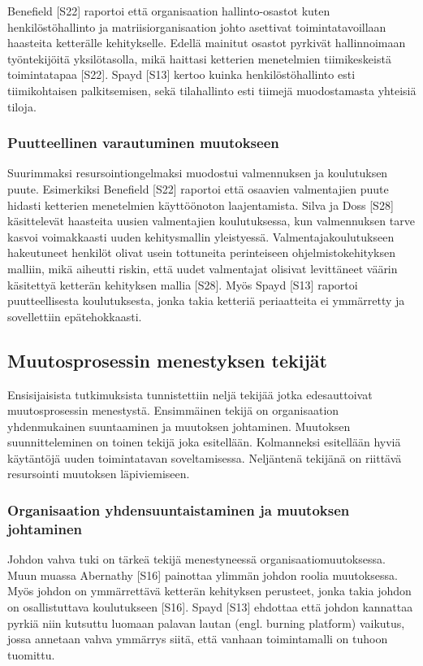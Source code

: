Benefield [S22] raportoi että organisaation hallinto-osastot kuten
henkilöstöhallinto ja matriisiorganisaation johto asettivat toimintatavoillaan
haasteita ketterälle kehitykselle. Edellä mainitut osastot pyrkivät
hallinnoimaan työntekijöitä yksilötasolla, mikä haittasi ketterien menetelmien
tiimikeskeistä toimintatapaa [S22]. Spayd [S13] kertoo kuinka henkilöstöhallinto
esti tiimikohtaisen palkitsemisen, sekä tilahallinto esti tiimejä muodostamasta
yhteisiä tiloja.

\subsubsection{Puutteellinen varautuminen muutokseen}

Suurimmaksi resursointiongelmaksi muodostui valmennuksen ja koulutuksen puute.
Esimerkiksi Benefield [S22] raportoi että osaavien valmentajien puute hidasti
ketterien menetelmien käyttöönoton laajentamista. Silva ja Doss [S28]
käsittelevät haasteita uusien valmentajien koulutuksessa, kun valmennuksen tarve
kasvoi voimakkaasti uuden kehitysmallin yleistyessä. Valmentajakoulutukseen
hakeutuneet henkilöt olivat usein tottuneita perinteiseen ohjelmistokehityksen
malliin, mikä aiheutti riskin, että uudet valmentajat olisivat levittäneet
väärin käsitettyä ketterän kehityksen mallia [S28]. Myös Spayd [S13] raportoi
puutteellisesta koulutuksesta, jonka takia ketteriä periaatteita ei ymmärretty
ja sovellettiin epätehokkaasti.

\subsection{Muutosprosessin menestyksen tekijät}

Ensisijaisista tutkimuksista tunnistettiin neljä tekijää jotka edesauttoivat
muutosprosessin menestystä. Ensimmäinen tekijä on organisaation yhdenmukainen
suuntaaminen ja muutoksen johtaminen. Muutoksen suunnitteleminen on toinen
tekijä joka esitellään. Kolmanneksi esitellään hyviä käytäntöjä uuden
toimintatavan soveltamisessa. Neljäntenä tekijänä on riittävä resursointi
muutoksen läpiviemiseen.

\subsubsection{Organisaation yhdensuuntaistaminen ja muutoksen johtaminen}

Johdon vahva tuki on tärkeä tekijä menestyneessä organisaatiomuutoksessa.
Muun muassa Abernathy [S16] painottaa ylimmän johdon roolia muutoksessa. Myös
johdon on ymmärrettävä ketterän kehityksen perusteet, jonka takia johdon on
osallistuttava koulutukseen [S16]. Spayd [S13] ehdottaa että johdon kannattaa
pyrkiä niin kutsuttu luomaan palavan lautan (engl. burning platform) vaikutus,
jossa annetaan vahva ymmärrys siitä, että vanhaan toimintamalli on tuhoon
tuomittu.

